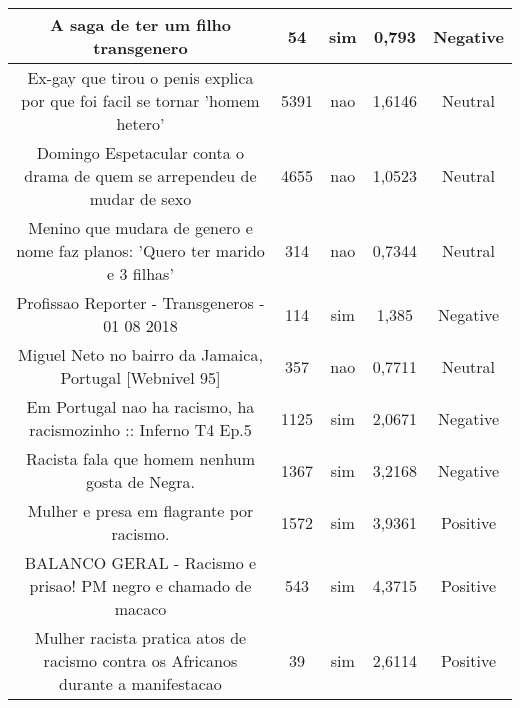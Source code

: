 \documentclass[11pt]{article}
\newlength\mylength
\begin{document}
\begin{center}
\begin{longtable}{||C{.40\mylength}||C{.20\mylength}||C{.20\mylength}||C{.30\mylength}||C{.20\mylength}||}
  A saga de ter um filho transgenero & 54 & sim & 0,793 & Negative \\  \hline
  Ex-gay que tirou o penis explica por que foi facil se tornar 'homem hetero' & 5391 & nao & 1,6146 & Neutral \\  \hline
  Domingo Espetacular conta o drama de quem se arrependeu de mudar de sexo & 4655 & nao & 1,0523 & Neutral \\  \hline
  Menino que mudara de genero e nome faz planos: 'Quero ter marido e 3 filhas' & 314 & nao & 0,7344 & Neutral \\  \hline
  Profissao Reporter - Transgeneros - 01 08 2018 & 114 & sim & 1,385 & Negative \\  \hline
   Miguel Neto no bairro da Jamaica, Portugal [Webnivel 95]  & 357 & nao & 0,7711 & Neutral \\  \hline
   Em Portugal nao ha racismo, ha racismozinho :: Inferno T4 Ep.5  & 1125 & sim & 2,0671 & Negative \\  \hline
   Racista fala que homem nenhum gosta de Negra.  & 1367 & sim & 3,2168 & Negative \\  \hline
   Mulher e presa em flagrante por racismo.  & 1572 & sim & 3,9361 & Positive \\  \hline
   BALANCO GERAL - Racismo e prisao! PM negro e chamado de macaco  & 543 & sim & 4,3715 & Positive \\  \hline
   Mulher racista pratica atos de racismo contra os Africanos durante a manifestacao  & 39 & sim & 2,6114 & Positive \\  \hline

\end{longtable}
\end{center}
\end{document}
